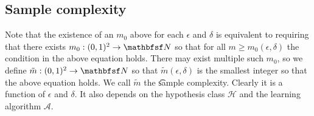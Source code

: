\subsection*{Sample complexity}

Note that the existence of an $m_0$ above for each $\epsilon $ and $\delta $ is equivalent to requiring that there exists $m_0: (0, 1)^2 \to \N$ so that for all $m \geq m_0(\epsilon ,\delta )$ the condition in the above equation holds.
There may exist multiple such $m_0$, so we define $\tilde{m}: (0, 1)^2 \to \N  $ so that $\tilde{m}(\epsilon ,\delta )$ is the smallest integer so that the above equation holds.
We call $\tilde{m}$ the \t{sample complexity}.
Clearly it is a function of $\epsilon $ and $\delta $.
It also depends on the hypothesis class $\mathcal{H} $ and the learning algorithm $\mathcal{A} $.

\blankpage